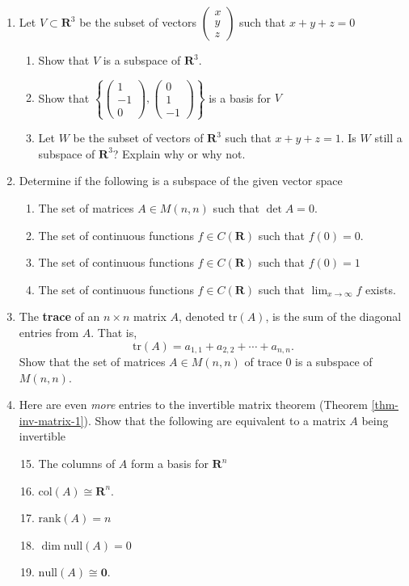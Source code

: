 \documentclass[12pt]{article}
\numberwithin{equation}{subsection}
\numberwithin{figure}{subsection}
\theoremstyle{note}
\newcommand\tr[1]{\mathrm{tr}(#1)}
\newcommand\nul[1]{\mathrm{null}(#1)}
\newcommand\col[1]{\mathrm{col}(#1)}
\newcommand\rank[1]{\mathrm{rank}(#1)}
\begin{document}
\begin{enumerate}[label=\arabic*.]
\begin{enumerate}
	\end{enumerate}	
	\item Let $V\subset \mathbf{R}^3$ be the subset of vectors $\begin{pmatrix} x \\ y \\z\end{pmatrix}$ such that $x+y+z=0$
	\begin{enumerate}
		\item Show that $V$ is a subspace of $\mathbf{R}^3$.
		\item Show that $\left\{ \begin{pmatrix} 1 \\ -1 \\ 0 \end{pmatrix} , \begin{pmatrix} 0 \\ 1 \\ -1\end{pmatrix}\right\}$ is a basis for $V$
		\item Let $W$ be the subset of vectors of $\mathbf{R}^3$ such that $x+y+z=1$. Is $W$ still a subspace of $\mathbf{R}^3$? Explain why or why not. 	
	\end{enumerate}
	
	\item Determine if the following is a subspace of the given vector space
	
	\begin{enumerate}
		\item The set of matrices $A\in M(n,n)$ such that $\det A=0$.
		\item The set of continuous functions $f\in C(\mathbf{R})$ such that $f(0)=0$.
		\item The set of continuous functions $f\in C(\mathbf{R})$ such that $f(0)=1$
		\item The set of continuous functions $f\in C(\mathbf{R})$ such that $\lim_{x\to \infty} f$ exists.
	\end{enumerate}
	
	\item The \textbf{trace} of an $n\times n$ matrix $A$, denoted $\tr{A}$, is the sum of the diagonal entries from $A$. That is, \[ \tr{A}=a_{1,1}+a_{2,2}+\cdots+a_{n,n}.\]
		Show that the set of matrices $A\in M(n,n)$ of trace $0$ is a subspace of $M(n,n)$.
	
	\item  Here are even \textit{more} entries to the invertible matrix theorem (Theorem \ref{thm-inv-matrix-1}). Show that the following are equivalent to a matrix $A$ being invertible \begin{enumerate}\setcounter{enumii}{14}
		\item The columns of $A$ form a basis for $\mathbf{R}^n$
		\item $\col{A}\cong \mathbf{R}^n$.
		\item $\rank{A}=n$
		\item $\dim \nul{A}=0$
		\item $\nul{A}\cong \mathbf{0}$. 
	\end{enumerate}
	

\end{enumerate}
\end{document}
